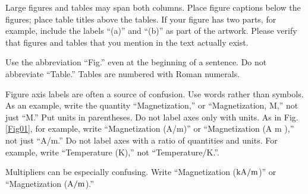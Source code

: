 \documentclass{fullpaper_hutech_v1.02}
\begin{document}
Large figures and tables may span both columns. Place figure captions below the figures; place table titles above the tables. If your figure has two parts, for example, include the labels ``(a)'' and ``(b)'' as part of the artwork. Please verify that figures and tables that you mention in the text actually exist.

Use the abbreviation ``Fig.'' even at the beginning of a sentence. Do not abbreviate ``Table.'' Tables are numbered with Roman numerals.

Figure axis labels are often a source of confusion. Use words rather than symbols. As an example, write the quantity ``Magnetization,'' or ``Magnetization, M,'' not just ``M.'' Put units in parentheses. Do not label axes only with units. As in Fig. \ref{Fig01}, for example, write ``Magnetization (A/m)'' or ``Magnetization (A m ),'' not just ``A/m.'' Do not label axes with a ratio of quantities and units. For example, write ``Temperature (K),'' not ``Temperature/K.''.

Multipliers can be especially confusing. Write ``Magnetization ($\rm kA/m$)'' or ``Magnetization ($\rm A/m$).''
\end{document}

